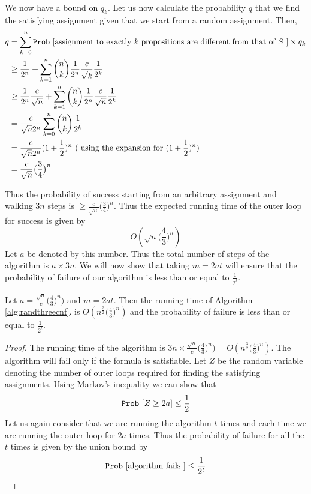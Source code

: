 We now have a bound on $q_k$. Let us now calculate the probability $q$ that we find the satisfying assignment given that we start from a random assignment. Then,
\begin{align*}
q & = \sum_{k=0}^n \mathtt{Prob}~[\text{assignment to exactly $k$ propositions are different from that of } S ~] \times q_k \\
& \geq \frac{1}{2^n} + \sum_{k=1}^n {n \choose k} \frac{1}{2^n}  \frac{c}{\sqrt{k}} \frac{1}{2^k} \\
& \geq \frac{1}{2^n} \frac{c}{\sqrt{n}} + \sum_{k=1}^n {n \choose k} \frac{1}{2^n}  \frac{c}{\sqrt{n}} \frac{1}{2^k} \\
& = \frac{c}{\sqrt{n}2^n} \sum_{k=0}^n {n \choose k}  \frac{1}{2^k}  \\
& = \frac{c}{\sqrt{n}2^n} (1 + \frac{1}{2})^n ~(\text{ using the expansion for } (1 + \frac{1}{2})^n ) \\
& = \frac{c}{\sqrt{n}} \big(\frac{3}{4}\big)^n 
\end{align*}

Thus the probability of success starting from an arbitrary assignment and walking $3n$ steps is $\geq \frac{c}{\sqrt{n}} \big(\frac{3}{4}\big)^n$. Thus the expected running time of the outer loop for success is given by 
\[
O(\sqrt{n} \big(\frac{4}{3}\big)^n)
\]
Let $a$ be denoted by this number. Thus the total number of steps of the algorithm is $a \times 3n$. We will now show that taking $m = 2at$ will ensure that the probability of failure of our algorithm is less than or equal to $\frac{1}{2^t}$. 
\begin{theorem}
Let $a = \frac{\sqrt{n}}{c} \big(\frac{4}{3}\big)^n)$ and $m = 2at$. Then the running time of Algorithm \ref{alg:randthreecnf}. is $O(n^{\frac{3}{2}}\big(\frac{4}{3}\big)^n)$ and the probability of failure is less than or equal to $\frac{1}{2^t}$. 
\end{theorem}
\begin{proof}
The running time of the algorithm is $3n \times \frac{\sqrt{n}}{c} \big(\frac{4}{3}\big)^n) = O(n^{\frac{3}{2}}\big(\frac{4}{3}\big)^n)$. The algorithm will fail only if the formula is satisfiable. Let $Z$ be the random variable denoting the number of outer loops required for finding the satisfying assignments. Using Markov's inequality we can show that
\[
\mathtt{Prob}~[Z \geq 2a] \leq \frac{1}{2}
\]
Let us again consider that we are running the algorithm $t$ times and each time we are running the outer loop for $2a$ times. Thus the probability of failure for all the $t$ times is given by the union bound by
\[
\mathtt{Prob}~[\text{algorithm fails }] \leq \frac{1}{2^t}
\]

\end{proof}


